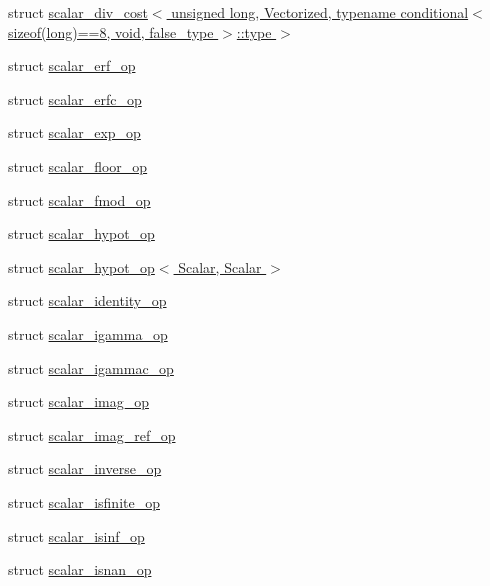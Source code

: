 \begin{DoxyCompactItemize}
\item 
struct \hyperlink{struct_eigen_1_1internal_1_1scalar__div__cost_3_01unsigned_01long_00_01_vectorized_00_01typenamea197e29684b99203d4e90be10117c3ad}{scalar\+\_\+div\+\_\+cost$<$ unsigned long, Vectorized, typename conditional$<$ sizeof(long)==8, void, false\+\_\+type $>$\+::type $>$}
\item 
struct \hyperlink{struct_eigen_1_1internal_1_1scalar__erf__op}{scalar\+\_\+erf\+\_\+op}
\item 
struct \hyperlink{struct_eigen_1_1internal_1_1scalar__erfc__op}{scalar\+\_\+erfc\+\_\+op}
\item 
struct \hyperlink{struct_eigen_1_1internal_1_1scalar__exp__op}{scalar\+\_\+exp\+\_\+op}
\item 
struct \hyperlink{struct_eigen_1_1internal_1_1scalar__floor__op}{scalar\+\_\+floor\+\_\+op}
\item 
struct \hyperlink{struct_eigen_1_1internal_1_1scalar__fmod__op}{scalar\+\_\+fmod\+\_\+op}
\item 
struct \hyperlink{struct_eigen_1_1internal_1_1scalar__hypot__op}{scalar\+\_\+hypot\+\_\+op}
\item 
struct \hyperlink{struct_eigen_1_1internal_1_1scalar__hypot__op_3_01_scalar_00_01_scalar_01_4}{scalar\+\_\+hypot\+\_\+op$<$ Scalar, Scalar $>$}
\item 
struct \hyperlink{struct_eigen_1_1internal_1_1scalar__identity__op}{scalar\+\_\+identity\+\_\+op}
\item 
struct \hyperlink{struct_eigen_1_1internal_1_1scalar__igamma__op}{scalar\+\_\+igamma\+\_\+op}
\item 
struct \hyperlink{struct_eigen_1_1internal_1_1scalar__igammac__op}{scalar\+\_\+igammac\+\_\+op}
\item 
struct \hyperlink{struct_eigen_1_1internal_1_1scalar__imag__op}{scalar\+\_\+imag\+\_\+op}
\item 
struct \hyperlink{struct_eigen_1_1internal_1_1scalar__imag__ref__op}{scalar\+\_\+imag\+\_\+ref\+\_\+op}
\item 
struct \hyperlink{struct_eigen_1_1internal_1_1scalar__inverse__op}{scalar\+\_\+inverse\+\_\+op}
\item 
struct \hyperlink{struct_eigen_1_1internal_1_1scalar__isfinite__op}{scalar\+\_\+isfinite\+\_\+op}
\item 
struct \hyperlink{struct_eigen_1_1internal_1_1scalar__isinf__op}{scalar\+\_\+isinf\+\_\+op}
\item 
struct \hyperlink{struct_eigen_1_1internal_1_1scalar__isnan__op}{scalar\+\_\+isnan\+\_\+op}

\end{DoxyCompactItemize}
